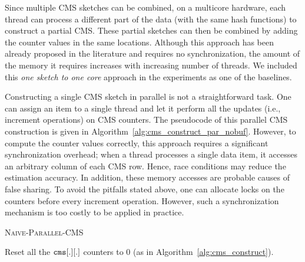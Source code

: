 \documentclass[runningheads]{llncs}
\begin{document}
Since multiple CMS sketches can be combined, on a multicore hardware, each thread can process a different part of the data (with the same hash functions) to construct a partial CMS. These partial sketches can then be combined by adding the counter values in the same locations.
Although this approach has been already proposed in the literature and requires no synchronization,
the amount of the memory it requires increases with increasing number of threads. We included this {\em one sketch to one core} approach in the experiments as one of the baselines. 

Constructing a single CMS sketch in parallel is not a straightforward task. One can assign an item to a single thread and let it perform all the updates (i.e., increment operations) on CMS counters. The pseudocode of this parallel CMS construction is given in Algorithm~\ref{alg:cms_construct_par_nobuf}. However, to compute the counter values correctly, this approach requires a significant synchronization overhead; when a thread processes a single data item, it accesses an arbitrary column of each CMS row. Hence, race conditions may reduce the estimation accuracy. In addition, these memory accesses are probable causes of false sharing. 
To avoid the pitfalls stated above, one can allocate locks on the counters before every increment operation. However, such a   synchronization mechanism is too costly to be applied in practice. 

\renewcommand{\baselinestretch}{0.9}
 \begin{algorithm}[htbp]
  	\small
  	\caption{\textsc{Naive-Parallel-CMS}} 
  	\SetAlgoNoLine
		Reset all the ${\tt cms}[.][.]$ counters to 0 (as in Algorithm~\ref{alg:cms_construct}).\\
	\label{alg:cms_construct_par_nobuf}
\end{algorithm} 	
\renewcommand{\baselinestretch}{1}
\end{document}
